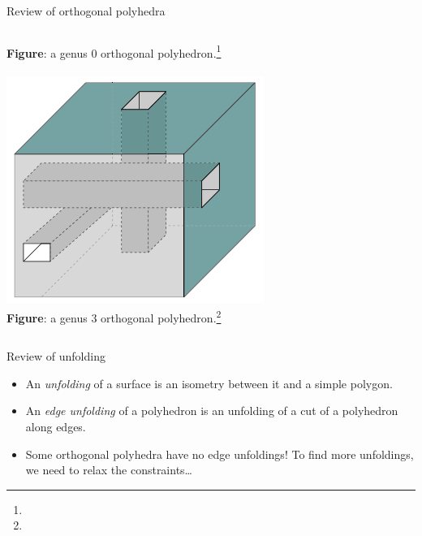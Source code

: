 \documentclass{beamer}
\theoremstyle{plain}
\begin{document}
\begin{frame}{Review of orthogonal polyhedra}
\begin{columns}
\begin{column}{.2\textwidth}
\begin{center}
          \tiny\textbf{Figure}: a genus 0 orthogonal polyhedron.\footnote[frame]{}\\
          \; \\
          \includegraphics[width=.8\textwidth]{./figs/genus_3_orthogonal_polyhedron.png}\\
          \tiny\textbf{Figure}: a genus 3 orthogonal polyhedron.\footnote[frame]{}
        \end{center}
      \end{column}
    \end{columns}
  \end{frame}

  \begin{frame}{Review of unfolding}
    \begin{itemize}
      \item An \emph{unfolding} of a surface is an isometry between it and a simple polygon.
      \pause \item An \emph{edge unfolding} of a polyhedron is an unfolding of a cut of a polyhedron along edges.
      \pause \item Some orthogonal polyhedra have no edge unfoldings!
        To find more unfoldings, we need to relax the constraints\ldots 
    \end{itemize}
  \end{frame}
\end{document}

